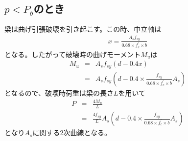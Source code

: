 \documentclass[pdflatex,ja=standard,fleqn]{bxjsarticle}
\begin{document}
\subsection{$p<P_{b}$のとき}
梁は曲げ引張破壊を引き起こす。この時、中立軸は
\begin{eqnarray*}
    x=\frac{A_{s}f_{sy}}{0.68\times f^{\prime}_{c}\times b}
\end{eqnarray*}
となる。したがって破壊時の曲げモーメント$M_{u}$は
\begin{eqnarray*}
    M_{u}&=&A_{s}f_{sy}(d-0.4x)\\
    &=&A_{s}f_{sy}(d-0.4\times \frac{f_{sy}}{0.68\times f^{\prime}_{c}\times b}A_{s})
\end{eqnarray*}
となるので、破壊時荷重は梁の長さ$L$を用いて
\begin{eqnarray*}
    P&=&\frac{4M_{u}}{L}\\
    &=&\frac{4f_{sy}}{L}A_{s}(d-0.4\times \frac{f_{sy}}{0.68\times f^{\prime}_{c}\times b}A_{s})
\end{eqnarray*}
となり$A_{s}$に関する2次曲線となる。
\end{document}
